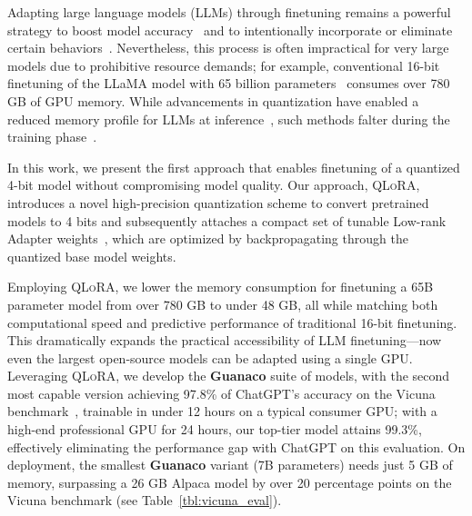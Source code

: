 Adapting large language models (LLMs) through finetuning remains a powerful strategy to boost model accuracy~\citep{min2021metaicl, wei2021finetuned, ouyang2022training, wang2022super, wang2022self, liu2022few} and to intentionally incorporate or eliminate certain behaviors~\citep{ouyang2022training,askell2021general,bai2022training}. Nevertheless, this process is often impractical for very large models due to prohibitive resource demands; for example, conventional 16-bit finetuning of the LLaMA model with 65 billion parameters~\citep{touvron2023llama} consumes over 780 GB of GPU memory. While advancements in quantization have enabled a reduced memory profile for LLMs at inference~\citep{dettmers2022llm, dettmers2022case, frantar2022gptq, xiao2022smoothquant}, such methods falter during the training phase~\citep{wortsman2023stable}.

In this work, we present the first approach that enables finetuning of a quantized 4-bit model without compromising model quality. Our approach, \textsc{QLoRA}, introduces a novel high-precision quantization scheme to convert pretrained models to 4 bits and subsequently attaches a compact set of tunable Low-rank Adapter weights~\citep{hu2021lora}, which are optimized by backpropagating through the quantized base model weights.

Employing \textsc{QLoRA}, we lower the memory consumption for finetuning a 65B parameter model from over 780 GB to under 48 GB, all while matching both computational speed and predictive performance of traditional 16-bit finetuning. This dramatically expands the practical accessibility of LLM finetuning—now even the largest open-source models can be adapted using a single GPU. Leveraging \textsc{QLoRA}, we develop the \textbf{Guanaco} suite of models, with the second most capable version achieving 97.8\% of ChatGPT’s accuracy on the Vicuna benchmark~\citep{vicuna2023}, trainable in under 12 hours on a typical consumer GPU; with a high-end professional GPU for 24 hours, our top-tier model attains 99.3\%, effectively eliminating the performance gap with ChatGPT on this evaluation. On deployment, the smallest \textbf{Guanaco} variant (7B parameters) needs just 5 GB of memory, surpassing a 26 GB Alpaca model by over 20 percentage points on the Vicuna benchmark (see Table~\ref{tbl:vicuna_eval}).

